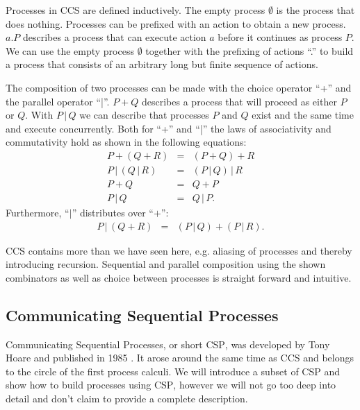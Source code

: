 Processes in \textsc{CCS} are defined inductively. The empty process $\emptyset$ is the process that does nothing. Processes can be prefixed with an action to obtain a new process. $a.P$ describes a process that can execute action $a$ before it continues as process $P$. We can use the empty process $\emptyset$ together with the prefixing of actions \enquote{.} to build a process that consists of an arbitrary long but finite sequence of actions.

The composition of two processes can be made with the choice operator \enquote{+} and the parallel operator \enquote{|}. $P + Q$ describes a process that will proceed as either $P$ or $Q$. With $P \,|\, Q$ we can describe that processes $P$ and $Q$ exist and the same time and execute concurrently. Both for \enquote{+} and \enquote{|} the laws of associativity and commutativity hold as shown in the following equations:
\begin{eqnarray*}
  P + \left( Q + R \right) & = & \left( P + Q \right) + R \\
  P \,|\, \left( Q \,|\, R \right) & = & \left( P \,|\, Q \right) \,|\, R \\
  P + Q & = & Q + P \\
  P \,|\, Q & = & Q \,|\, P.
\end{eqnarray*}
Furthermore, \enquote{$|$} distributes over \enquote{$+$}:
\begin{eqnarray*}
  P \,|\, \left( Q + R \right) & = & \left( P \,|\, Q \right) + \left( P \,|\, R \right).
\end{eqnarray*}

\textsc{CCS} contains more than we have seen here, e.g. aliasing of processes and thereby introducing recursion. Sequential and parallel composition using the shown combinators as well as choice between processes is straight forward and intuitive.

\subsection{Communicating Sequential Processes}
Communicating Sequential Processes, or short \textsc{CSP}, was developed by Tony Hoare and published in 1985 \cite{Hoare:1985:CSP:3921}. It arose around the same time as \textsc{CCS} and belongs to the circle of the first process calculi. We will introduce a subset of \textsc{CSP} and show how to build processes using \textsc{CSP}, however we will not go too deep into detail and don't claim to provide a complete description.

